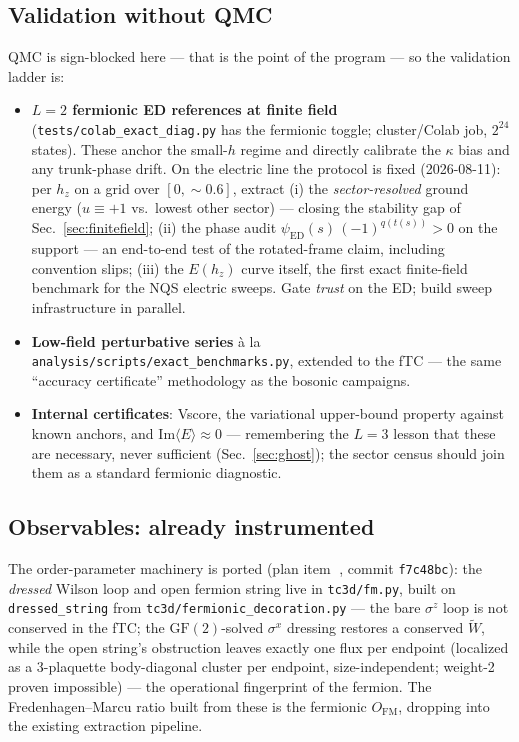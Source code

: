 \documentclass[11pt]{article}
\newcommand{\sx}{\sigma^x}
\newcommand{\sz}{\sigma^z}
\newcommand{\GF}{\mathrm{GF}(2)}
\newcommand{\file}[1]{\texttt{#1}}
\newcommand{\circled}[1]{\textcircled{\raisebox{-0.5pt}{\scriptsize #1}}}
\begin{document}
\subsection{Validation without QMC}
\label{sec:validation}
QMC is sign-blocked here --- that is the point of the program --- so the
validation ladder is:
\begin{itemize}
\item \textbf{$L=2$ fermionic ED references at finite field}
(\file{tests/colab\_exact\_diag.py} has the fermionic toggle; cluster/Colab
job, $2^{24}$ states). These anchor the small-$h$ regime and directly
calibrate the $\kappa$ bias and any trunk-phase drift. On the electric line
the protocol is fixed (2026-08-11): per $h_z$ on a grid over $[0,\sim0.6]$,
extract (i) the \emph{sector-resolved} ground energy ($u\equiv+1$ vs.\
lowest other sector) --- closing the stability gap of
Sec.~\ref{sec:finitefield}; (ii) the phase audit
$\psi_{\mathrm{ED}}(s)\,(-1)^{q(t(s))}>0$ on the support --- an end-to-end
test of the rotated-frame claim, including convention slips; (iii) the
$E(h_z)$ curve itself, the first exact finite-field benchmark for the NQS
electric sweeps. Gate \emph{trust} on the ED; build sweep infrastructure in
parallel.
\item \textbf{Low-field perturbative series} \`a la
\file{analysis/scripts/exact\_benchmarks.py}, extended to the fTC --- the same
``accuracy certificate'' methodology as the bosonic campaigns.
\item \textbf{Internal certificates}: Vscore, the variational upper-bound
property against known anchors, and $\mathrm{Im}\langle E\rangle\approx0$ ---
remembering the $L=3$ lesson that these are necessary, never sufficient
(Sec.~\ref{sec:ghost}); the sector census should join them as a standard
fermionic diagnostic.
\end{itemize}

\subsection{Observables: already instrumented}
The order-parameter machinery is ported (plan item \circled{4}, commit
\texttt{f7c48bc}): the \emph{dressed} Wilson loop and open fermion string
live in \file{tc3d/fm.py}, built on \texttt{dressed\_string} from
\file{tc3d/fermionic\_decoration.py} --- the bare
$\sz$ loop is not conserved in the fTC; the $\GF$-solved $\sx$ dressing
restores a conserved $\tilde W$, while the open string's obstruction leaves
exactly one flux per endpoint (localized as a 3-plaquette body-diagonal
cluster per endpoint, size-independent; weight-2 proven impossible) --- the
operational fingerprint of the fermion. The Fredenhagen--Marcu ratio built
from these is the fermionic $O_{\mathrm{FM}}$, dropping into the existing
extraction pipeline.
\end{document}
